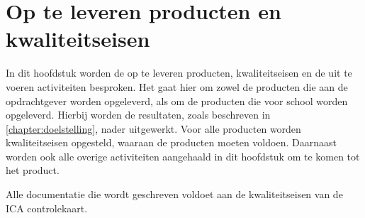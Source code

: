 \documentclass[a4paper, 11pt, oneside]{report}
\begin{document}
\chapter{Op te leveren producten en kwaliteitseisen}
\label{chapter:producten}
In dit hoofdstuk worden de op te leveren producten, kwaliteitseisen en de uit te voeren activiteiten besproken.
Het gaat hier om zowel de producten die aan de opdrachtgever worden opgeleverd, als om de producten die voor school worden opgeleverd.
Hierbij worden de resultaten, zoals beschreven in \autoref{chapter:doelstelling}, nader uitgewerkt.
Voor alle producten worden kwaliteitseisen opgesteld, waaraan de producten moeten voldoen.
Daarnaast worden ook alle overige activiteiten aangehaald in dit hoofdstuk om te komen tot het product.

Alle documentatie die wordt geschreven voldoet aan de kwaliteitseisen van de ICA controlekaart.
\end{document}
